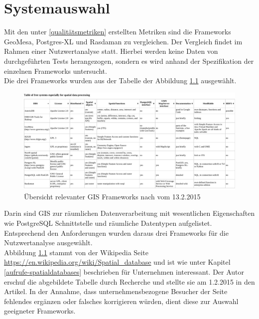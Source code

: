 \chapter{Systemauswahl}
Mit den unter \ref{qualitätsmetriken} erstellten Metriken sind die Frameworks GeoMesa, Postgres-XL und Rasdaman zu vergleichen.
Der Vergleich findet im Rahmen einer Nutzwertanalyse statt.
Hierbei werden keine Daten von durchgeführten Tests herangezogen, sondern es wird anhand der Spezifikation der einzelnen Frameworks untersucht.\\
%
Die drei Frameworks wurden aus der Tabelle der Abbildung \ref{fig:spatialdatabases} ausgewählt.
\begin{figure}
\centering
\includegraphics[angle=90,width=.66\textwidth]{Abbildungen/table_spatialdatabases_13_2_15.pdf}
\caption[Übersicht relevanter GIS Frameworks]{Übersicht relevanter GIS Frameworks nach \cite{website:wiki-spatialdatabase} vom 13.2.2015}
\label{fig:spatialdatabases}
\end{figure}
Darin sind GIS zur räumlichen Datenverarbeitung mit wesentlichen Eigenschaften wie \mbox{PostgreSQL} Schnittstelle und räumliche Datentypen aufgelistet.
Entsprechend den Anforderungen wurden daraus drei Frameworks für die Nutzwertanalyse ausgewählt.\\
Abbildung \ref{fig:spatialdatabases} stammt von der Wikipedia Seite \url{https://en.wikipedia.org/wiki/Spatial_database} und ist wie unter Kapitel \ref{aufrufe-spatialdatabases} beschrieben für Unternehmen interessant.
Der Autor erschuf die abgebildete Tabelle durch Recherche und stellte sie am 1.2.2015 in den Artikel.
In der Annahme, dass unternehmensbezogene Besucher der Seite fehlendes ergänzen oder falsches korrigieren würden, dient diese zur Auswahl geeigneter Frameworks.


